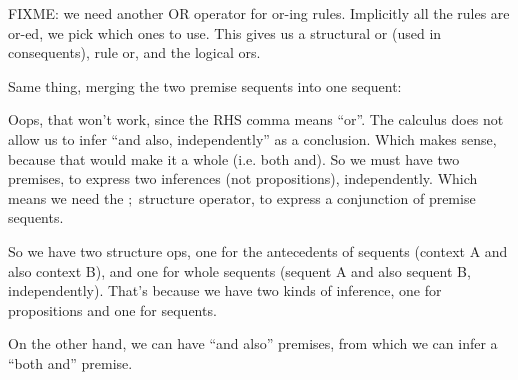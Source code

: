 \documentclass{article}
\begin{document}
FIXME: we need another OR operator for or-ing rules. Implicitly all
the rules are or-ed, we pick which ones to use. This gives us a
structural or (used in consequents), rule or, and the logical ors.





Same thing, merging the two premise sequents into one sequent:


Oops, that won't work, since the RHS comma means ``or''. The calculus
does not allow us to infer ``and also, independently'' as a conclusion.
Which makes sense, because that would make it a whole (i.e. both and).
So we must have two premises, to express two inferences (not
propositions), independently. Which means we need the $;$ structure
operator, to express a conjunction of premise sequents.

So we have two structure ops, one for the antecedents of sequents
(context A and also context B), and one for whole sequents (sequent A
and also sequent B, independently). That's because we have two kinds of
inference, one for propositions and one for sequents.

On the other hand, we can have ``and also'' premises, from which we
can infer a ``both and'' premise.

\end{document}
